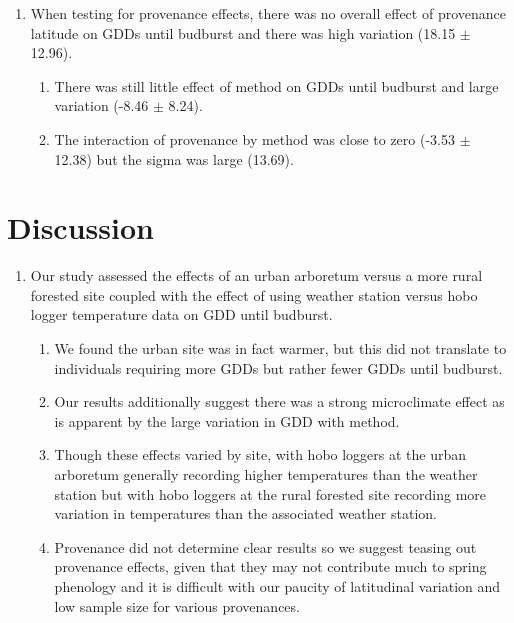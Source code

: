 \documentclass{article}\usepackage[]{graphicx}\usepackage[]{color}
\begin{document}
\begin{enumerate}
\item When testing for provenance effects, there was no overall effect of provenance latitude on GDDs until budburst and there was high variation (18.15 $\pm$ 12.96).
  \begin{enumerate}
  \item There was still little effect of method on GDDs until budburst and large variation (-8.46 $\pm$ 8.24).
  \item The interaction of provenance by method was close to zero (-3.53 $\pm$ 12.38) but the sigma was large (13.69).
\end{enumerate}
\end{enumerate}

\section*{Discussion} 

\begin{enumerate} 
\item Our study assessed the effects of an urban arboretum versus a more rural forested site coupled with the effect of using weather station versus hobo logger temperature data on GDD until budburst.
  \begin{enumerate} 
  \item We found the urban site was in fact warmer, but this did not translate to individuals requiring more GDDs but rather fewer GDDs until budburst.
  \item Our results additionally suggest there was a strong microclimate effect as is apparent by the large variation in GDD with method.
  \item Though these effects varied by site, with hobo loggers at the urban arboretum generally recording higher temperatures than the weather station but with hobo loggers at the rural forested site recording more variation in temperatures than the associated weather station.
  \item Provenance did not determine clear results so we suggest teasing out provenance effects, given that they may not contribute much to spring phenology \citep{Gauzere2017} and it is difficult with our paucity of latitudinal variation and low sample size for various provenances. 
  \end{enumerate}
  \end{enumerate}
\end{document}
